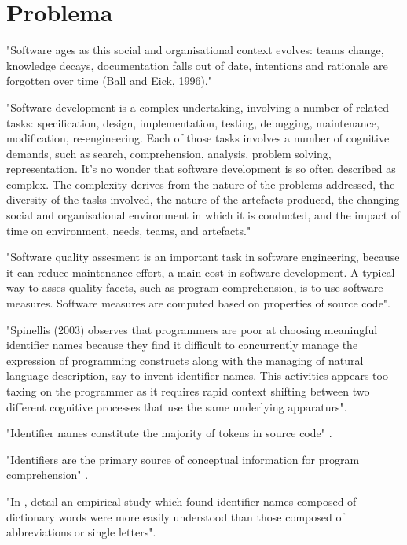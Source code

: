 \section{Problema}

"Software ages as this social and organisational context evolves: teams change,
knowledge decays, documentation falls out of date, intentions and rationale are forgotten over time
(Ball and Eick, 1996)."

"Software development is a complex undertaking, involving a number of related tasks: specification,
design, implementation, testing, debugging, maintenance, modification, re-engineering. Each of those
tasks involves a number of cognitive demands, such as search, comprehension, analysis, problem
solving, representation. It’s no wonder that software development is so often described as complex.
The complexity derives from the nature of the problems addressed, the diversity of the tasks involved,
the nature of the artefacts produced, the changing social and organisational environment in which it is
conducted, and the impact of time on environment, needs, teams, and artefacts."\cite{PetreDeQuincey06}

"Software quality assesment is an important task in software engineering, because it can
reduce maintenance effort, a main cost in software development.
A typical way to asses quality facets, such as program comprehension, is to use software
measures.
Software measures are computed based on properties of source code"\cite{Feigenspan2011}.

"Spinellis (2003) observes that programmers are poor at choosing meaningful identifier names
because they find it difficult to concurrently manage the expression of programming constructs
along with the managing of natural language description, say to invent identifier names.
This activities appears too taxing on the programmer as it requires rapid context shifting
between two different cognitive processes that use the same underlying apparaturs"\cite{Relf04}.

"Identifier names constitute the majority of tokens in source code" \cite{DeiBenbockPizka05}.

"Identifiers are the primary source of conceptual information for program
comprehension" \cite{RajlichWilde02}.

"In \cite{Lawrie2006}, detail an empirical study which found identifier names composed
of dictionary words were more easily understood than those composed of abbreviations
or single letters".

